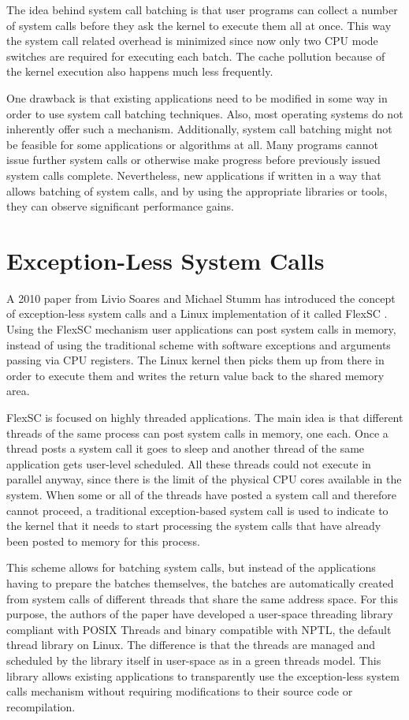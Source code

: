 The idea behind system call batching is that user programs can collect a number
of system calls before they ask the kernel to execute them all at once. This
way the system call related overhead is minimized since now only two CPU mode
switches are required for executing each batch. The cache pollution because of
the kernel execution also happens much less frequently.

One drawback is that existing applications need to be modified in some way in
order to use system call batching techniques. Also, most operating systems do
not inherently offer such a mechanism. Additionally, system call batching might
not be feasible for some applications or algorithms at all. Many programs
cannot issue further system calls or otherwise make progress before previously
issued system calls complete. Nevertheless, new applications if written in a
way that allows batching of system calls, and by using the appropriate
libraries or tools, they can observe significant performance gains.

\section{Exception-Less System Calls}

A 2010 paper from Livio Soares and Michael Stumm has introduced the concept of
exception-less system calls and a Linux implementation of it called FlexSC
\cite{flexsc}. Using the FlexSC mechanism user applications can post system
calls in memory, instead of using the traditional scheme with software
exceptions and arguments passing via CPU registers. The Linux kernel then picks
them up from there in order to execute them and writes the return value back to
the shared memory area.

FlexSC is focused on highly threaded applications. The main idea is that
different threads of the same process can post system calls in memory, one
each. Once a thread posts a system call it goes to sleep and another thread of
the same application gets user-level scheduled. All these threads could not
execute in parallel anyway, since there is the limit of the physical CPU cores
available in the system. When some or all of the threads have posted a system
call and therefore cannot proceed, a traditional exception-based system call is
used to indicate to the kernel that it needs to start processing the system
calls that have already been posted to memory for this process.

This scheme allows for batching system calls, but instead of the applications
having to prepare the batches themselves, the batches are automatically created
from system calls of different threads that share the same address space.  For
this purpose, the authors of the paper have developed a user-space threading
library compliant with POSIX Threads and binary compatible with NPTL, the
default thread library on Linux. The difference is that the threads are managed
and scheduled by the library itself in user-space as in a green threads model.
This library allows existing applications to transparently use the
exception-less system calls mechanism without requiring modifications to their
source code or recompilation.

